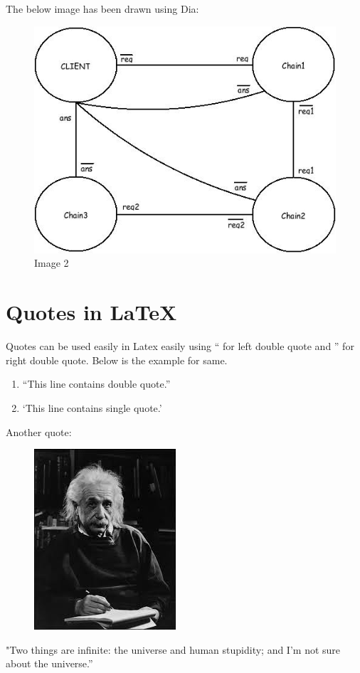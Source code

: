 \documentclass{report}
\begin{document}
The below image has been drawn using Dia:

\begin{figure}[h!]

\centering
\includegraphics[scale=.7]{./lab3_dia.jpeg}
\caption{Image 2}

\end{figure}


\section{Quotes in LaTeX}
Quotes can be used easily in Latex easily using `` for left double quote and '' for right double quote. Below is the example for same.

\begin{enumerate}
 \item ``This line contains double quote.''
 \item `This line contains single quote.'
\end{enumerate}

Another quote:

\begin{figure}[h!]

\centering
\includegraphics[scale=.7]{./ein.jpeg}

\end{figure}

"Two things are infinite: the universe and human stupidity; and I'm not sure about the universe.''
\end{document}
